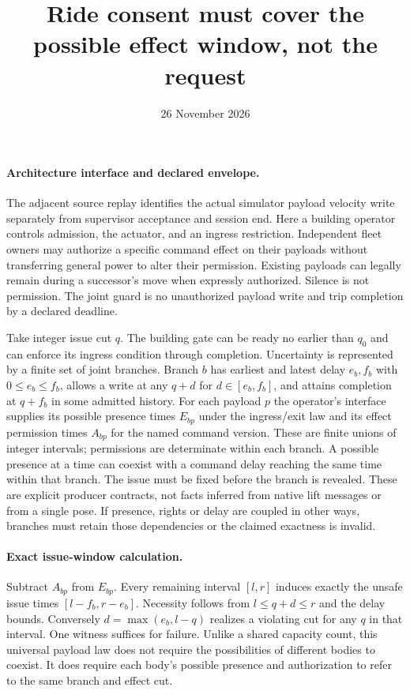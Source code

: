 \documentclass[11pt]{article}
\title{Ride consent must cover the possible effect window, not the request}
\date{26 November 2026}
\begin{document}
\maketitle
\paragraph{Architecture interface and declared envelope.}
The adjacent source replay identifies the actual simulator payload
velocity write separately from supervisor acceptance and session end.
Here a building operator controls admission, the actuator, and an
ingress restriction. Independent fleet owners may authorize a specific
command effect on their payloads without transferring general power to
alter their permission. Existing payloads can legally remain during a
successor's move when expressly authorized. Silence is not permission.
The joint guard is no unauthorized payload write and trip completion
by a declared deadline.

Take integer issue cut $q$. The building gate can be ready no earlier
than $q_0$ and can enforce its ingress condition through completion.
Uncertainty is represented by a finite set of joint branches. Branch
$b$ has earliest and latest delay $e_b,f_b$ with $0\le e_b\le f_b$,
allows a write at any $q+d$ for $d\in[e_b,f_b]$, and attains
completion at $q+f_b$ in some admitted history. For each payload $p$
the operator's interface supplies its possible presence times
$E_{bp}$ under the ingress/exit law and its effect permission times
$A_{bp}$ for the named command version. These are finite unions of
integer intervals; permissions are determinate within each branch.
A possible presence at a time can coexist with a command delay
reaching the same time within that branch. The issue must be fixed
before the branch is revealed. These are explicit producer contracts,
not facts inferred from native lift messages or from a single pose.
If presence, rights or delay are coupled in other ways, branches
must retain those dependencies or the claimed exactness is invalid.

\paragraph{Exact issue-window calculation.}
Subtract $A_{bp}$ from $E_{bp}$. Every remaining interval $[l,r]$
induces exactly the unsafe issue times $[l-f_b,r-e_b]$.
Necessity follows from $l\le q+d\le r$ and the delay bounds.
Conversely $d=\max(e_b,l-q)$ realizes a violating cut for any $q$
in that interval. One witness suffices for failure. Unlike a shared
capacity count, this universal payload law does not require the
possibilities of different bodies to coexist. It does require each
body's possible presence and authorization to refer to the same
branch and effect cut.
\end{document}
